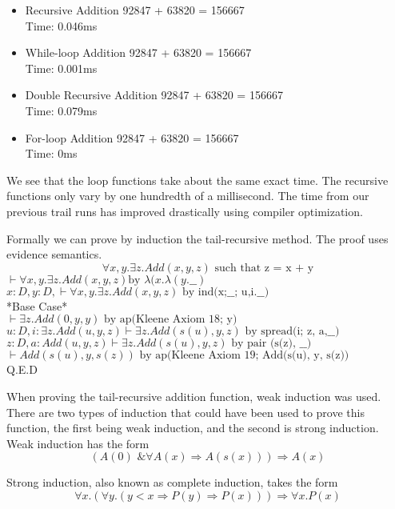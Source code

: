 \documentclass{article}
\begin{document}
\begin{itemize}
\item  Recursive Addition 92847 + 63820 = 156667 \\Time: 0.046ms

\item While-loop Addition 92847 + 63820 = 156667 \\Time: 0.001ms

\item Double Recursive Addition 92847 + 63820 = 156667 \\Time: 0.079ms

\item For-loop Addition 92847 + 63820 = 156667 \\Time: 0ms
\end{itemize}
We see that the loop functions take about the same exact time. The recursive functions only vary by one hundredth of a millisecond. The time from our previous trail runs has improved drastically using compiler optimization. 
 
Formally we can prove by induction the tail-recursive method. The proof uses evidence semantics.  
\[\forall x, y.\exists z.Add(x,y,z) \text{ such that z = x + y}\]
$\vdash \forall x, y.\exists z.Add(x,y,z)\text{by }\lambda(x.\lambda(y.\_\_)$\\
$x:D, y:D, \vdash \forall x, y.\exists z.Add(x,y,z) \text{ by ind(x;\_\_; u,i.\_\_)}$\\
*Base Case*\\
$\vdash \exists z.Add(0,y,y) \text{ by ap(Kleene Axiom 18; y) }$\\
$u:D, i: \exists z.Add(u,y,z) \vdash \exists z.Add(s(u),y,z)\text{ by spread(i; z, a,\_\_)}$\\
$z:D, a:Add(u,y,z) \vdash \exists z.Add(s(u),y,z)\text{ by pair (s(z), \_\_) }$\\
$\vdash Add(s(u), y , s(z)) \text{ by ap(Kleene Axiom 19; Add(s(u), y, s(z))}$\\


Q.E.D

When proving the tail-recursive addition function, weak induction was used. There are two types of induction that could have been used to prove this function, the first being weak induction, and the second is strong induction. Weak induction has the form \[ (A(0) \text{ \& } \forall A(x) \Rightarrow A(s(x))) \Rightarrow A(x)\]

Strong induction, also known as complete induction, takes the form \[ \forall x.(\forall y.(y < x \Rightarrow P(y) \Rightarrow P(x)))\Rightarrow \forall x.P(x) \]
\end{document}
